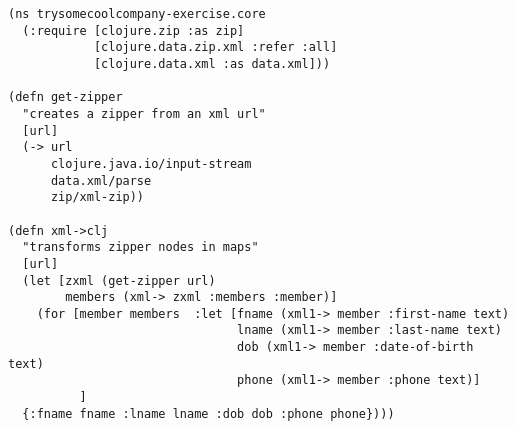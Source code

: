 \documentclass[11pt]{article}
\begin{document}
\begin{verbatim}
(ns trysomecoolcompany-exercise.core
  (:require [clojure.zip :as zip]
            [clojure.data.zip.xml :refer :all]
            [clojure.data.xml :as data.xml]))

(defn get-zipper 
  "creates a zipper from an xml url"
  [url]
  (-> url
      clojure.java.io/input-stream
      data.xml/parse
      zip/xml-zip))

(defn xml->clj
  "transforms zipper nodes in maps"
  [url]
  (let [zxml (get-zipper url)
        members (xml-> zxml :members :member)]
    (for [member members  :let [fname (xml1-> member :first-name text)
                                lname (xml1-> member :last-name text)
                                dob (xml1-> member :date-of-birth text)
                                phone (xml1-> member :phone text)]
          ]
  {:fname fname :lname lname :dob dob :phone phone})))
\end{verbatim}
\end{document}
